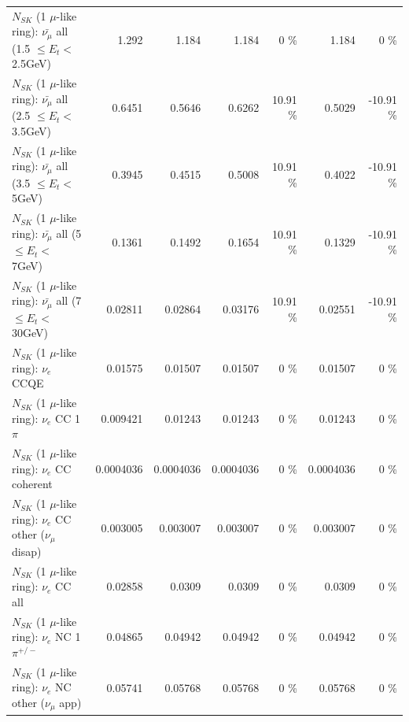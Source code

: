 \begin{table}
\begin{tabular}{| l | r | r | r  r | r  r |}
 $N_{SK}$ (1 $\mu$-like ring): $\bar{\nu_{\mu}}$ all (1.5 $\leq E_{t} <$ 2.5GeV) &           1.292 &           1.184 &           1.184 &        0 \%  &           1.184 &        0 \%  \\ 
 $N_{SK}$ (1 $\mu$-like ring): $\bar{\nu_{\mu}}$ all (2.5 $\leq E_{t} <$ 3.5GeV) &          0.6451 &          0.5646 &          0.6262 &    10.91 \%  &          0.5029 &   -10.91 \%  \\ 
   $N_{SK}$ (1 $\mu$-like ring): $\bar{\nu_{\mu}}$ all (3.5 $\leq E_{t} <$ 5GeV) &          0.3945 &          0.4515 &          0.5008 &    10.91 \%  &          0.4022 &   -10.91 \%  \\ 
     $N_{SK}$ (1 $\mu$-like ring): $\bar{\nu_{\mu}}$ all (5 $\leq E_{t} <$ 7GeV) &          0.1361 &          0.1492 &          0.1654 &    10.91 \%  &          0.1329 &   -10.91 \%  \\ 
    $N_{SK}$ (1 $\mu$-like ring): $\bar{\nu_{\mu}}$ all (7 $\leq E_{t} <$ 30GeV) &         0.02811 &         0.02864 &         0.03176 &    10.91 \%  &         0.02551 &   -10.91 \%  \\ 
\hline
\hline
\hline
                                      $N_{SK}$ (1 $\mu$-like ring): $\nu_e$ CCQE &         0.01575 &         0.01507 &         0.01507 &        0 \%  &         0.01507 &        0 \%  \\ 
                                 $N_{SK}$ (1 $\mu$-like ring): $\nu_e$ CC 1$\pi$ &        0.009421 &         0.01243 &         0.01243 &        0 \%  &         0.01243 &        0 \%  \\ 
                               $N_{SK}$ (1 $\mu$-like ring): $\nu_e$ CC coherent &       0.0004036 &       0.0004036 &       0.0004036 &        0 \%  &       0.0004036 &        0 \%  \\ 
                $N_{SK}$ (1 $\mu$-like ring): $\nu_e$ CC other ($\nu_\mu$ disap) &        0.003005 &        0.003007 &        0.003007 &        0 \%  &        0.003007 &        0 \%  \\ 
                                  $N_{SK}$ (1 $\mu$-like ring): $\nu_{e}$ CC all &         0.02858 &          0.0309 &          0.0309 &        0 \%  &          0.0309 &        0 \%  \\ 
\hline
                           $N_{SK}$ (1 $\mu$-like ring): $\nu_e$ NC 1$\pi^{+/-}$ &         0.04865 &         0.04942 &         0.04942 &        0 \%  &         0.04942 &        0 \%  \\ 
                  $N_{SK}$ (1 $\mu$-like ring): $\nu_e$ NC other ($\nu_\mu$ app) &         0.05741 &         0.05768 &         0.05768 &        0 \%  &         0.05768 &        0 \%  \\ 

\end{tabular}
\end{table}

